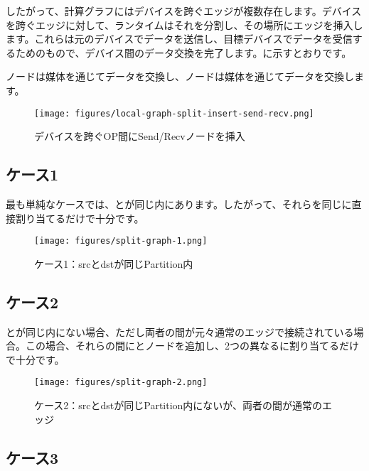 \begin{content}
したがって、計算グラフにはデバイスを跨ぐエッジが複数存在します。デバイスを跨ぐエッジに対して、ランタイムはそれを分割し、その場所にエッジを挿入します。これらは元のデバイスでデータを送信し、目標デバイスでデータを受信するためのもので、デバイス間のデータ交換を完了します。に示すとおりです。

ノードは媒体を通じてデータを交換し、ノードは媒体を通じてデータを交換します。

\begin{figure}[H]
\centering
\texttt{[image: figures/local-graph-split-insert-send-recv.png]}
\caption{デバイスを跨ぐOP間にSend/Recvノードを挿入}
 \label{fig:local-graph-split-insert-send-recv}
\end{figure}

\subsection{ケース1}

最も単純なケースでは、とが同じ内にあります。したがって、それらを同じに直接割り当てるだけで十分です。

\begin{figure}[H]
\centering
\texttt{[image: figures/split-graph-1.png]}
\caption{ケース1：srcとdstが同じPartition内}
 \label{fig:split-graph-1}
\end{figure}

\subsection{ケース2}

とが同じ内にない場合、ただし両者の間が元々通常のエッジで接続されている場合。この場合、それらの間にとノードを追加し、2つの異なるに割り当てるだけで十分です。

\begin{figure}[H]
\centering
\texttt{[image: figures/split-graph-2.png]}
\caption{ケース2：srcとdstが同じPartition内にないが、両者の間が通常のエッジ}
 \label{fig:split-graph-2}
\end{figure}

\subsection{ケース3}


\end{content}
